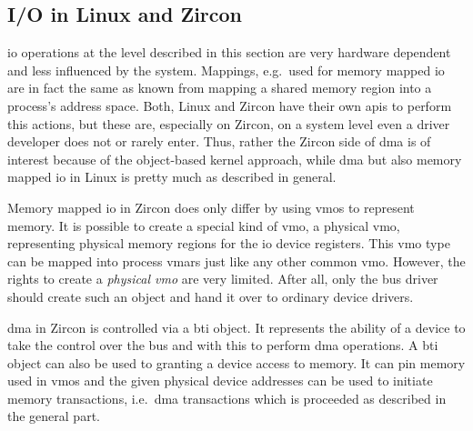 \subsection{I/O in Linux and Zircon}
\ac{io} operations at the level described in this section are very hardware dependent and less influenced by the system. 
Mappings, e.g.\ used for memory mapped \ac{io} are in fact the same as known from mapping a shared memory region into a process's address space.
Both, Linux and Zircon have their own \acp{api} to perform this actions, but these are, especially on Zircon, on a system level even a driver developer does not or rarely enter.  
Thus, rather the Zircon side of \ac{dma} is of interest because of the object-based kernel approach, while \ac{dma} but also memory mapped \ac{io} in Linux is pretty much as described in general.

Memory mapped \ac{io} in Zircon does only differ by using \acp{vmo} to represent memory.
It is possible to create a special kind of \ac{vmo}, a physical \ac{vmo}, representing physical memory regions for the \ac{io} device registers.
This \ac{vmo} type can be mapped into process \acp{vmar} just like any other common \ac{vmo}.
However, the rights to create a \textit{physical \ac{vmo}} are very limited.
After all, only the bus driver should create such an object and hand it over to ordinary device drivers\cite{zircon-irc-io}.

\ac{dma} in Zircon is controlled via a \ac{bti} object.
It represents the ability of a device to take the control over the bus and with this to perform \ac{dma} operations.
A \ac{bti} object can also be used to granting a device access to memory.
It can pin memory used in \acp{vmo} and the given physical device addresses can be used to initiate memory transactions, i.e.\ \ac{dma} transactions which is proceeded as described in the general part\cite{zircon-bti}.


